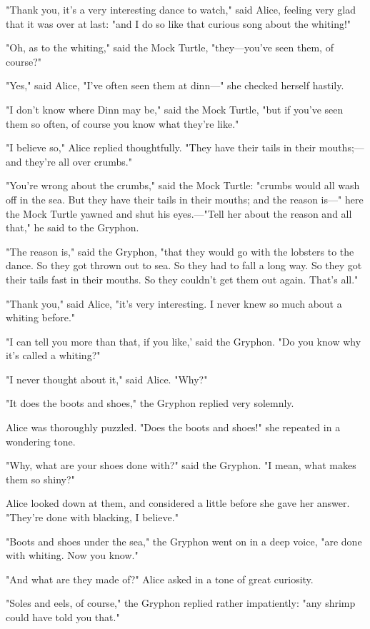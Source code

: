 "Thank you, it's a very interesting dance to watch," said Alice, feeling very glad that it was over at last: "and I do so like that curious song about the whiting!"

"Oh, as to the whiting," said the Mock Turtle, "they—you've seen them, of course?"

"Yes," said Alice, "I've often seen them at dinn—" she checked herself hastily.

"I don't know where Dinn may be," said the Mock Turtle, "but if you've seen them so often, of course you know what they're like."

"I believe so," Alice replied thoughtfully. ​"They have their tails in their mouths;—and they're all over crumbs."

"You're wrong about the crumbs," said the Mock Turtle: "crumbs would all wash off in the sea. But they have their tails in their mouths; and the reason is—" here the Mock Turtle yawned and shut his eyes.—"Tell her about the reason and all that," he said to the Gryphon.

"The reason is," said the Gryphon, "that they would go with the lobsters to the dance. So they got thrown out to sea. So they had to fall a long way. So they got their tails fast in their mouths. So they couldn't get them out again. That's all."

"Thank you," said Alice, "it's very interesting. I never knew so much about a whiting before."

"I can tell you more than that, if you like,' said the Gryphon. "Do you know why it's called a whiting?"

"I never thought about it," said Alice. "Why?"

​"It does the boots and shoes," the Gryphon replied very solemnly.

Alice was thoroughly puzzled. "Does the boots and shoes!" she repeated in a wondering tone.

"Why, what are your shoes done with?" said the Gryphon. "I mean, what makes them so shiny?"

Alice looked down at them, and considered a little before she gave her answer. "They're done with blacking, I believe."

"Boots and shoes under the sea," the Gryphon went on in a deep voice, "are done with whiting. Now you know."

"And what are they made of?" Alice asked in a tone of great curiosity.

"Soles and eels, of course," the Gryphon replied rather impatiently: "any shrimp could have told you that."

